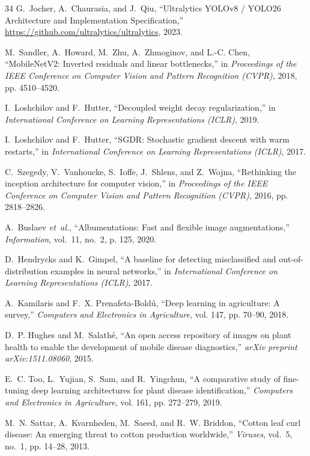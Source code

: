 \documentclass[journal,10pt,twocolumn]{IEEEtran}
\begin{document}
\begin{thebibliography}{34}
G.~Jocher, A.~Chaurasia, and J.~Qiu, ``Ultralytics YOLOv8 / YOLO26 Architecture and Implementation Specification,'' \url{https://github.com/ultralytics/ultralytics}, 2023.

M.~Sandler, A.~Howard, M.~Zhu, A.~Zhmoginov, and L.-C. Chen, ``MobileNetV2: Inverted residuals and linear bottlenecks,'' in \emph{Proceedings of the IEEE Conference on Computer Vision and Pattern Recognition (CVPR)}, 2018, pp. 4510--4520.

I.~Loshchilov and F.~Hutter, ``Decoupled weight decay regularization,'' in \emph{International Conference on Learning Representations (ICLR)}, 2019.

I.~Loshchilov and F.~Hutter, ``SGDR: Stochastic gradient descent with warm restarts,'' in \emph{International Conference on Learning Representations (ICLR)}, 2017.

C.~Szegedy, V.~Vanhoucke, S.~Ioffe, J.~Shlens, and Z.~Wojna, ``Rethinking the inception architecture for computer vision,'' in \emph{Proceedings of the IEEE Conference on Computer Vision and Pattern Recognition (CVPR)}, 2016, pp. 2818--2826.

A.~Buslaev \emph{et~al.}, ``Albumentations: Fast and flexible image augmentations,'' \emph{Information}, vol.~11, no.~2, p. 125, 2020.

D.~Hendrycks and K.~Gimpel, ``A baseline for detecting misclassified and out-of-distribution examples in neural networks,'' in \emph{International Conference on Learning Representations (ICLR)}, 2017.

A.~Kamilaris and F.~X. Prenafeta-Bold{\'u}, ``Deep learning in agriculture: A survey,'' \emph{Computers and Electronics in Agriculture}, vol. 147, pp. 70--90, 2018.

D.~P. Hughes and M.~Salath{\'e}, ``An open access repository of images on plant health to enable the development of mobile disease diagnostics,'' \emph{arXiv preprint arXiv:1511.08060}, 2015.

E.~C. Too, L.~Yujian, S.~Sam, and R.~Yingchun, ``A comparative study of fine-tuning deep learning architectures for plant disease identification,'' \emph{Computers and Electronics in Agriculture}, vol. 161, pp. 272--279, 2019.

M.~N. Sattar, A.~Kvarnheden, M.~Saeed, and R.~W. Briddon, ``Cotton leaf curl disease: An emerging threat to cotton production worldwide,'' \emph{Viruses}, vol.~5, no.~1, pp. 14--28, 2013.


\end{thebibliography}
\end{document}
